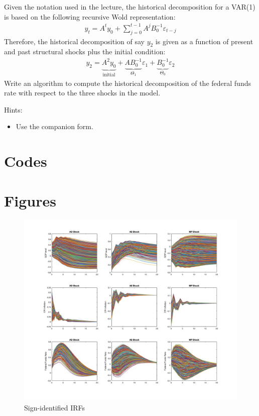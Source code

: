 \documentclass{article}
\begin{document}
Given the notation used in the lecture, the historical decomposition for a VAR(1)
is based on the following recursive Wold representation:
\begin{align*}
y_t = A^t y_0 + \sum_{j=0}^{t-1} A^j B_0^{-1} \varepsilon_{t-j}
\end{align*}
Therefore, the historical decomposition of say \(y_{2}\) is given as a function of present and past structural shocks
plus the initial condition:
\begin{align*}
y_{2} = \underbrace{A^2 y_0}_{\text{initial}} + \underbrace{A B_0^{-1}}_{\Theta_1} \varepsilon_{1} + \underbrace{B_0^{-1}}_{\Theta_0} \varepsilon_{2}
\end{align*}
Write an algorithm to compute the historical decomposition of the federal funds rate with respect to the three shocks in the model.

Hints:
\begin{itemize}
	\item Use the companion form.
\end{itemize} 

\newpage
\appendix

\printbibliography
\newpage
\section{Codes}


\newpage

\section{Figures}
\begin{figure}[htbp]\caption[]{Sign-identified IRFs}\label{fig:signSVAR}
	\includegraphics[width=\textwidth]{../plots/signIRFs.jpg}
\end{figure}
\end{document}
